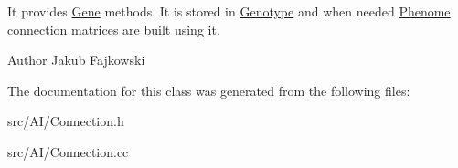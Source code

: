 It provides \hyperlink{classGene}{Gene} methods. It is stored in \hyperlink{classGenotype}{Genotype} and when needed \hyperlink{classPhenome}{Phenome} connection matrices are built using it. \begin{DoxyAuthor}{Author}
Jakub Fajkowski 
\end{DoxyAuthor}


The documentation for this class was generated from the following files\+:\begin{DoxyCompactItemize}
\item 
src/\+A\+I/Connection.\+h\item 
src/\+A\+I/Connection.\+cc\end{DoxyCompactItemize}
